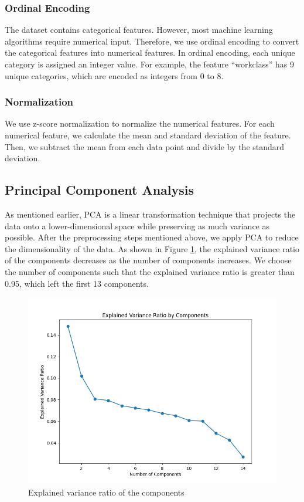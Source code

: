 \documentclass[conference]{IEEEtran}
\begin{document}
\subsubsection{Ordinal Encoding}

The dataset contains categorical features.
However, most machine learning algorithms require numerical input.
Therefore, we use ordinal encoding to convert the categorical features into numerical features.
In ordinal encoding, each unique category is assigned an integer value.
For example, the feature ``workclass'' has 9 unique categories, which are encoded as integers from 0 to 8.

\subsubsection{Normalization}

We use z-score normalization to normalize the numerical features.
For each numerical feature, we calculate the mean and standard deviation of the feature.
Then, we subtract the mean from each data point and divide by the standard deviation.

\subsection{Principal Component Analysis}

As mentioned earlier, PCA is a linear transformation technique that projects the data onto a lower-dimensional space while preserving as much variance as possible.
After the preprocessing steps mentioned above, we apply PCA to reduce the dimensionality of the data.
As shown in Figure \ref{fig:pca_explained_variance}, the explained variance ratio of the components decreases as the number of components increases.
We choose the number of components such that the explained variance ratio is greater than 0.95, which left the first 13 components.

\begin{figure}[!ht]
    \centering
    \includegraphics[width=\linewidth]{figure/ACI PCA.png}
    \caption{Explained variance ratio of the components}
    \label{fig:pca_explained_variance}
\end{figure}
\end{document}
